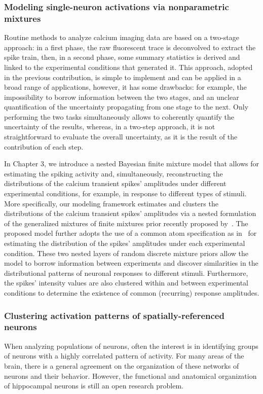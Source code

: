 \subsubsection{Modeling single-neuron activations via nonparametric mixtures}
Routine methods to analyze calcium imaging data are based on a two-stage approach: in a first phase, the raw fluorescent trace is deconvolved to extract the spike train, then, in a second phase, some summary statistics is derived and linked to the experimental conditions that generated it. 
This approach, adopted in the previous contribution, is simple to implement and can be applied in a broad range of applications, however, it has some drawbacks: for example, the impossibility to borrow information between the two stages, and an unclear quantification of the uncertainty propagating from one stage to the next. Only performing the two tasks simultaneously allows to coherently quantify the uncertainty of the results, whereas, in a two-step approach, it is not straightforward to evaluate the overall uncertainty, as it is the result of the contribution of each step. 

In Chapter 3, we introduce a nested Bayesian finite mixture model that allows for estimating the spiking activity and, simultaneously, reconstructing the distributions of the calcium transient spikes' amplitudes under different experimental conditions, for example, in response to different types of stimuli.
More specifically, our modeling framework estimates and clusters the distributions of the calcium transient spikes’ amplitudes via a nested formulation of the generalized mixtures of finite mixtures prior recently proposed by~\textcite{fruhwirthschnatter2020}. The proposed model further adopts the use of a common atom specification as in~\textcite{denti2021} for estimating the distribution of the spikes’ amplitudes under each experimental condition. 
These two nested layers of random discrete mixture priors allow the model to borrow information between experiments and discover similarities in the distributional patterns of neuronal responses to different stimuli. Furthermore, the spikes’ intensity values are also clustered within and between experimental conditions to determine the existence of common (recurring) response amplitudes.




\subsubsection{Clustering activation patterns of spatially-referenced neurons}
When analyzing populations of neurons, often the interest is in identifying groups of neurons with a highly correlated pattern of activity. For many areas of the brain, there is a general agreement on the organization of these networks of neurons and their behavior.
However, the functional and anatomical organization of hippocampal neurons is still an open research problem. 

